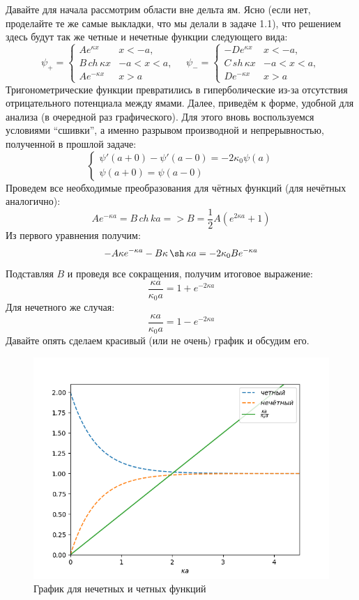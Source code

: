 Давайте для начала рассмотрим области вне дельта ям. Ясно (если нет, проделайте те же самые выкладки, что мы делали в задаче 1.1), что решением здесь будут так же четные и нечетные функции следующего вида:
\[
\psi_+ =
\begin{cases}
    Ae^{\kappa x}& x < -a,\\
    B\,ch\,\kappa x & -a < x < a,\\
    Ae^{-\kappa x}& x > a
\end{cases}\quad
\psi_- =
\begin{cases}
    -De^{\kappa x}& x < -a,\\
    C\, sh\, \kappa x & -a < x < a,\\
    De^{-\kappa x}& x > a
\end{cases}
\]
Тригонометрические функции превратились в гиперболические из-за отсутствия отрицательного потенциала между ямами. Далее, приведём к форме, удобной для анализа (в очередной раз графического). Для этого вновь воспользуемся условиями ``сшивки'', а именно разрывом производной и непрерывностью, полученной в прошлой задаче:
\[
\begin{cases}
\psi'(a+0) - \psi'(a-0) = -2\kappa_0\psi(a)\\
\psi(a+0) = \psi(a-0)    
\end{cases}
\]
Проведем все необходимые преобразования для чётных функций (для нечётных аналогично):
\[
Ae^{-\kappa a} = B\,ch\,ka => B = \frac{1}{2}A(e^{2\kappa a} + 1)
\]
Из первого уравнения получим:
\[
-A\kappa e^{-\kappa a} - B\kappa\,\sh\,\kappa a = -2\kappa_0 Be^{-\kappa a}
\]
Подставляя $B$ и проведя все сокращения, получим итоговое выражение:
\begin{equation}
    \frac{\kappa a}{\kappa_0 a} = 1 + e^{-2\kappa a}
\end{equation}
Для нечетного же случая:
\begin{equation}
    \frac{\kappa a}{\kappa_0 a} = 1 - e^{-2\kappa a}
\end{equation}
Давайте опять сделаем красивый (или не очень) график и обсудим его.
\begin{figure}[h!]
\centering
\includegraphics[scale=0.5]{class 4/images/delta.png}
\caption{График для нечетных и четных функций}
\label{fig 4.4}
\end{figure}

